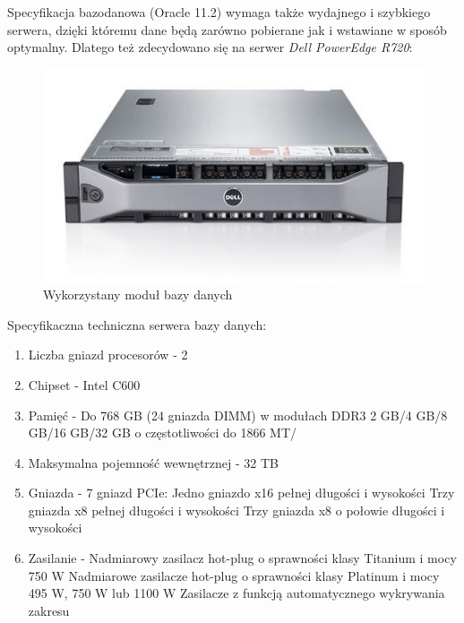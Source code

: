 Specyfikacja bazodanowa (Oracle 11.2) wymaga także wydajnego i szybkiego
serwera, dzięki któremu dane będą zarówno pobierane jak i wstawiane w sposób
optymalny. Dlatego też zdecydowano się na serwer \emph{Dell PowerEdge R720}:

\begin{figure}[h!]
    \includegraphics[width=\textwidth,
    height=0.2\textheight]{graphics/SerwerBazodanowy.jpg}
  \caption{Wykorzystany moduł bazy danych}
\end{figure}


Specyfikaczna techniczna serwera bazy danych:

\begin{enumerate}
  \item Liczba gniazd procesorów - 2
  \item Chipset - Intel C600
  \item Pamięć - Do 768 GB (24 gniazda DIMM) w modułach DDR3 2 GB/4 GB/8 GB/16
  GB/32 GB o częstotliwości do 1866 MT/
  \item Maksymalna pojemność wewnętrznej - 32 TB
  \item Gniazda - 7 gniazd PCIe:
	Jedno gniazdo x16 pełnej długości i wysokości 
	Trzy gniazda x8 pełnej długości i wysokości
	Trzy gniazda x8 o połowie długości i wysokości
  \item Zasilanie - Nadmiarowy zasilacz hot-plug o sprawności klasy Titanium i mocy 750 W
	Nadmiarowe zasilacze hot-plug o sprawności klasy Platinum i mocy 495 W, 750 W
	lub 1100 W Zasilacze z funkcją automatycznego wykrywania zakresu
\end{enumerate}
